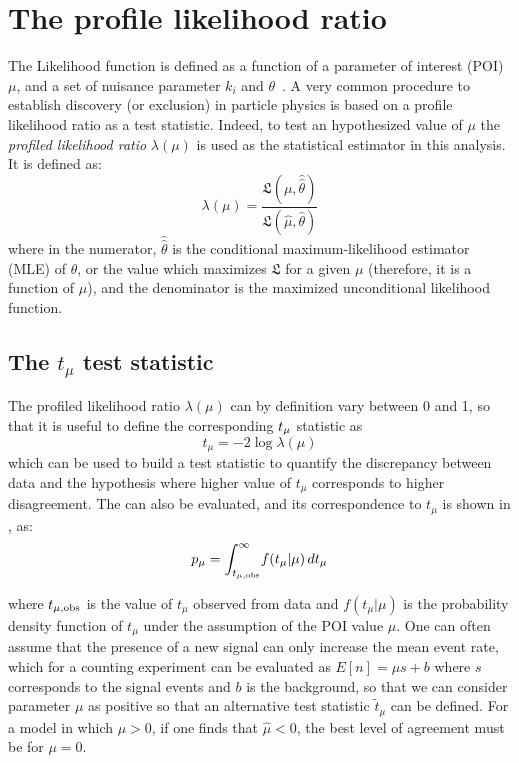 \section{The profile likelihood ratio}
The Likelihood function is defined as a function of a parameter of interest (POI) $\mu$, and a set of nuisance parameter $k_i$ and $\theta$~\cite{Cowan}.
A very common procedure to establish discovery (or exclusion) in particle physics is based on a profile likelihood ratio as a test statistic. Indeed, to test an hypothesized value of $\mu$ the \emph{profiled likelihood ratio} $\lambda(\mu)$ is used as the statistical estimator in this analysis. It is defined as:
\begin{equation}
  \lambda(\mu) = \frac {\mathfrak{L}(\mu,\hat{\hat{\theta}})}{\mathfrak{L(\hat{\mu},\hat{\theta})}}
  \label{eqn:profiled}
\end{equation}
where in the numerator, $\hat{\hat{\theta}}$ is the conditional maximum-likelihood estimator (MLE) of $\theta$, or the value which maximizes $\mathfrak{L}$ for a given $\mu$ (therefore, it is a function of $\mu$), and the denominator is the maximized unconditional likelihood function.

\subsection{The $t_\mu$ test statistic}
The profiled likelihood ratio $\lambda(\mu)$ can by definition vary between 0 and 1, so that it is useful to define the corresponding $t_{\mu}$ statistic as 
\begin{equation}
  t_{\mu} = -2 \log{\lambda(\mu)}
\end{equation}
which can be used to build a test statistic to quantify the discrepancy between data and the hypothesis where higher value of $t_{\mu}$ corresponds to higher disagreement. The \p can also be evaluated, and its correspondence to $t_{\mu}$ is shown in \Fig{\ref{pvalue}}, as:
\begin{equation}
 p_{\mu}=\int_{t_{\mu,\textup{obs}}}^\infty\! f(t_\mu \vert \mu)\, dt_\mu
 \label{eqn:pdatmu}
\end{equation}

where $t_{\mu,\textup{obs}}$ is the value of $t_\mu$ observed from data and $f(t_\mu \vert \mu)$ is the probability density function of $t_\mu$ under the assumption of the POI value $\mu$. One can often assume that the presence of a new signal can only increase the mean event rate, which for a counting experiment can be evaluated as $E[n] = \mu s + b$ where $s$ corresponds to the signal events and $b$ is the background, so that we can consider parameter $\mu$ as positive so that an alternative test statistic $\tilde{t}_\mu$ can be defined. For a model in which $\mu>0$, if one finds that $\hat{\mu}<0$, the best level of agreement must be for $\mu=0$.

